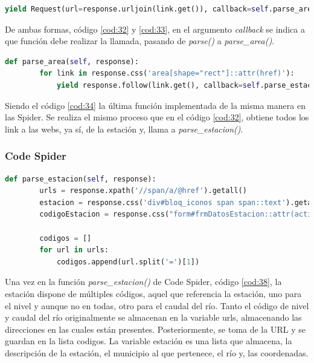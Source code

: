 \begin{lstlisting}[language=Python, caption={Alternativa a \textit{response.follow()}, mediante el uso de \textit{Request}}, label=cod:33]
	yield Request(url=response.urljoin(link.get()), callback=self.parse_area)
\end{lstlisting}

De ambas formas, código \ref{cod:32} y \ref{cod:33}, en el argumento \textit{callback} se indica a que función debe realizar la llamada, pasando de \textit{parse()} a \textit{parse\_area()}.

\begin{lstlisting}[language=Python, caption={Función \textit{parse\_area()} Agua en Navarra Spiders}, label=cod:34]
	def parse_area(self, response):
		for link in response.css('area[shape="rect"]::attr(href)'):
			yield response.follow(link.get(), callback=self.parse_estacion)
\end{lstlisting}

Siendo el código \ref{cod:34} la última función implementada de la misma manera en las Spider. Se realiza el mismo proceso que en el código \ref{cod:32}, obtiene todos los link a las webs, ya sí, de la estación y, llama a \textit{parse\_estacion()}.

\subsubsection{Code Spider}

\begin{lstlisting}[language=Python, caption={Función \textit{parse\_estacion()} Agua en Navarra Code Spider}, label=cod:38]
	def parse_estacion(self, response):
		urls = response.xpath('//span/a/@href').getall()
		estacion = response.css('div#bloq_iconos span span::text').getall()
		codigoEstacion = response.css("form#frmDatosEstacion::attr(action)").get()
		
		codigos = []
		for url in urls:
			codigos.append(url.split('=')[1])
\end{lstlisting}

Una vez en la función \textit{parse\_estacion()} de Code Spider, código \ref{cod:38}, la estación dispone de múltiples códigos, aquel que referencia la estación, uno para el nivel y aunque no en todas, otro para el caudal del río. Tanto el código de nivel y caudal del río originalmente se almacenan en la variable urls, almacenando las direcciones en las cuales están presentes. Posteriormente, se toma de la URL y se guardan en la lista codigos. La variable estación es una lista que almacena, la descripción de la estación, el municipio al que pertenece, el río y, las coordenadas.


